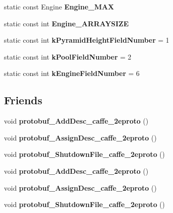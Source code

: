 \begin{DoxyCompactItemize}
static const Engine {\bfseries Engine\+\_\+\+M\+AX}
\item 
static const int {\bfseries Engine\+\_\+\+A\+R\+R\+A\+Y\+S\+I\+ZE}
\item 
\mbox{\label{classcaffe_1_1_s_p_p_parameter_aa7c26f13303313c19417e7d6410549cc}} 
static const int {\bfseries k\+Pyramid\+Height\+Field\+Number} = 1
\item 
\mbox{\label{classcaffe_1_1_s_p_p_parameter_a2cdb42acd2beb9f1fa1f13b77fcc9440}} 
static const int {\bfseries k\+Pool\+Field\+Number} = 2
\item 
\mbox{\label{classcaffe_1_1_s_p_p_parameter_a8c0fc9a5c9fe03b9022dcc5a2f26e2bb}} 
static const int {\bfseries k\+Engine\+Field\+Number} = 6
\end{DoxyCompactItemize}
\subsection*{Friends}
\begin{DoxyCompactItemize}
\item 
\mbox{\label{classcaffe_1_1_s_p_p_parameter_a2670a9c8ffd0e5105cf7522cd6f8613d}} 
void {\bfseries protobuf\+\_\+\+Add\+Desc\+\_\+caffe\+\_\+2eproto} ()
\item 
\mbox{\label{classcaffe_1_1_s_p_p_parameter_a7f145bddbdde78003d27e42c7e003d23}} 
void {\bfseries protobuf\+\_\+\+Assign\+Desc\+\_\+caffe\+\_\+2eproto} ()
\item 
\mbox{\label{classcaffe_1_1_s_p_p_parameter_a026784a8e4e76f1b4daf9d033d2ece83}} 
void {\bfseries protobuf\+\_\+\+Shutdown\+File\+\_\+caffe\+\_\+2eproto} ()
\item 
\mbox{\label{classcaffe_1_1_s_p_p_parameter_a2670a9c8ffd0e5105cf7522cd6f8613d}} 
void {\bfseries protobuf\+\_\+\+Add\+Desc\+\_\+caffe\+\_\+2eproto} ()
\item 
\mbox{\label{classcaffe_1_1_s_p_p_parameter_a7f145bddbdde78003d27e42c7e003d23}} 
void {\bfseries protobuf\+\_\+\+Assign\+Desc\+\_\+caffe\+\_\+2eproto} ()
\item 
\mbox{\label{classcaffe_1_1_s_p_p_parameter_a026784a8e4e76f1b4daf9d033d2ece83}} 
void {\bfseries protobuf\+\_\+\+Shutdown\+File\+\_\+caffe\+\_\+2eproto} ()
\end{DoxyCompactItemize}


